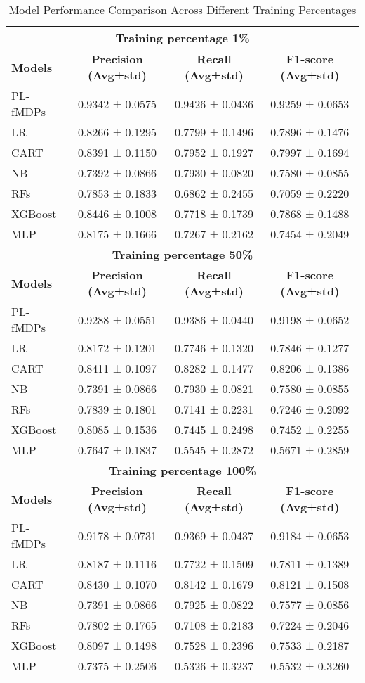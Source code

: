 \begin{table}[htbp]
\centering
\caption{Model Performance Comparison Across Different Training Percentages}
\label{tab:model_comparison}
\begin{tabular}{|l|ccc|}
\hline
\multicolumn{4}{|c|}{\textbf{Training percentage 1\%}} \\
\hline
\textbf{Models} & \textbf{Precision (Avg±std)} & \textbf{Recall (Avg±std)} & \textbf{F1-score (Avg±std)} \\
\hline
PL-fMDPs & 0.9342 ± 0.0575 & 0.9426 ± 0.0436 & 0.9259 ± 0.0653 \\
LR & 0.8266 ± 0.1295 & 0.7799 ± 0.1496 & 0.7896 ± 0.1476 \\
CART & 0.8391 ± 0.1150 & 0.7952 ± 0.1927 & 0.7997 ± 0.1694 \\
NB & 0.7392 ± 0.0866 & 0.7930 ± 0.0820 & 0.7580 ± 0.0855 \\
RFs & 0.7853 ± 0.1833 & 0.6862 ± 0.2455 & 0.7059 ± 0.2220 \\
XGBoost & 0.8446 ± 0.1008 & 0.7718 ± 0.1739 & 0.7868 ± 0.1488 \\
MLP & 0.8175 ± 0.1666 & 0.7267 ± 0.2162 & 0.7454 ± 0.2049 \\
\hline
\multicolumn{4}{|c|}{\textbf{Training percentage 50\%}} \\
\hline
\textbf{Models} & \textbf{Precision (Avg±std)} & \textbf{Recall (Avg±std)} & \textbf{F1-score (Avg±std)} \\
\hline
PL-fMDPs & 0.9288 ± 0.0551 & 0.9386 ± 0.0440 & 0.9198 ± 0.0652 \\
LR & 0.8172 ± 0.1201 & 0.7746 ± 0.1320 & 0.7846 ± 0.1277 \\
CART & 0.8411 ± 0.1097 & 0.8282 ± 0.1477 & 0.8206 ± 0.1386 \\
NB & 0.7391 ± 0.0866 & 0.7930 ± 0.0821 & 0.7580 ± 0.0855 \\
RFs & 0.7839 ± 0.1801 & 0.7141 ± 0.2231 & 0.7246 ± 0.2092 \\
XGBoost & 0.8085 ± 0.1536 & 0.7445 ± 0.2498 & 0.7452 ± 0.2255 \\
MLP & 0.7647 ± 0.1837 & 0.5545 ± 0.2872 & 0.5671 ± 0.2859 \\
\hline
\multicolumn{4}{|c|}{\textbf{Training percentage 100\%}} \\
\hline
\textbf{Models} & \textbf{Precision (Avg±std)} & \textbf{Recall (Avg±std)} & \textbf{F1-score (Avg±std)} \\
\hline
PL-fMDPs & 0.9178 ± 0.0731 & 0.9369 ± 0.0437 & 0.9184 ± 0.0653 \\
LR & 0.8187 ± 0.1116 & 0.7722 ± 0.1509 & 0.7811 ± 0.1389 \\
CART & 0.8430 ± 0.1070 & 0.8142 ± 0.1679 & 0.8121 ± 0.1508 \\
NB & 0.7391 ± 0.0866 & 0.7925 ± 0.0822 & 0.7577 ± 0.0856 \\
RFs & 0.7802 ± 0.1765 & 0.7108 ± 0.2183 & 0.7224 ± 0.2046 \\
XGBoost & 0.8097 ± 0.1498 & 0.7528 ± 0.2396 & 0.7533 ± 0.2187 \\
MLP & 0.7375 ± 0.2506 & 0.5326 ± 0.3237 & 0.5532 ± 0.3260 \\
\hline
\end{tabular}
\end{table}